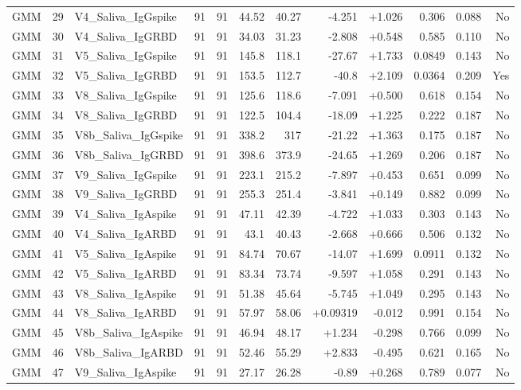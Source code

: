 \begin{landscape}
\begin{longtable}{@{}lrp{4.0cm}rrrrrrrrr@{}}
GMM & 29 & V4\_Saliva\_IgGspike & 91 & 91 & 44.52 & 40.27 & -4.251 & +1.026 & 0.306 & 0.088 & No \\
GMM & 30 & V4\_Saliva\_IgGRBD & 91 & 91 & 34.03 & 31.23 & -2.808 & +0.548 & 0.585 & 0.110 & No \\
GMM & 31 & V5\_Saliva\_IgGspike & 91 & 91 & 145.8 & 118.1 & -27.67 & +1.733 & 0.0849 & 0.143 & No \\
GMM & 32 & V5\_Saliva\_IgGRBD & 91 & 91 & 153.5 & 112.7 & -40.8 & +2.109 & 0.0364 & 0.209 & Yes \\
GMM & 33 & V8\_Saliva\_IgGspike & 91 & 91 & 125.6 & 118.6 & -7.091 & +0.500 & 0.618 & 0.154 & No \\
GMM & 34 & V8\_Saliva\_IgGRBD & 91 & 91 & 122.5 & 104.4 & -18.09 & +1.225 & 0.222 & 0.187 & No \\
GMM & 35 & V8b\_Saliva\_IgGspike & 91 & 91 & 338.2 & 317 & -21.22 & +1.363 & 0.175 & 0.187 & No \\
GMM & 36 & V8b\_Saliva\_IgGRBD & 91 & 91 & 398.6 & 373.9 & -24.65 & +1.269 & 0.206 & 0.187 & No \\
GMM & 37 & V9\_Saliva\_IgGspike & 91 & 91 & 223.1 & 215.2 & -7.897 & +0.453 & 0.651 & 0.099 & No \\
GMM & 38 & V9\_Saliva\_IgGRBD & 91 & 91 & 255.3 & 251.4 & -3.841 & +0.149 & 0.882 & 0.099 & No \\
GMM & 39 & V4\_Saliva\_IgAspike & 91 & 91 & 47.11 & 42.39 & -4.722 & +1.033 & 0.303 & 0.143 & No \\
GMM & 40 & V4\_Saliva\_IgARBD & 91 & 91 & 43.1 & 40.43 & -2.668 & +0.666 & 0.506 & 0.132 & No \\
GMM & 41 & V5\_Saliva\_IgAspike & 91 & 91 & 84.74 & 70.67 & -14.07 & +1.699 & 0.0911 & 0.132 & No \\
GMM & 42 & V5\_Saliva\_IgARBD & 91 & 91 & 83.34 & 73.74 & -9.597 & +1.058 & 0.291 & 0.143 & No \\
GMM & 43 & V8\_Saliva\_IgAspike & 91 & 91 & 51.38 & 45.64 & -5.745 & +1.049 & 0.295 & 0.143 & No \\
GMM & 44 & V8\_Saliva\_IgARBD & 91 & 91 & 57.97 & 58.06 & +0.09319 & -0.012 & 0.991 & 0.154 & No \\
GMM & 45 & V8b\_Saliva\_IgAspike & 91 & 91 & 46.94 & 48.17 & +1.234 & -0.298 & 0.766 & 0.099 & No \\
GMM & 46 & V8b\_Saliva\_IgARBD & 91 & 91 & 52.46 & 55.29 & +2.833 & -0.495 & 0.621 & 0.165 & No \\
GMM & 47 & V9\_Saliva\_IgAspike & 91 & 91 & 27.17 & 26.28 & -0.89 & +0.268 & 0.789 & 0.077 & No \\

\end{longtable}
\end{landscape}
